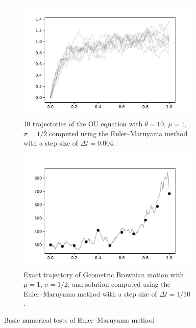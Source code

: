 \documentclass[12pt]{article}
\begin{document}
\begin{figure}[ht!]\centering
\begin{subfigure}{.48\textwidth}\centering
    \includegraphics[width=\textwidth]{img/OU_em_10.pdf}
    \caption{10 trajectories of the OU equation with \( \theta = 10 \), \( \mu = 1 \), \( \sigma = 1/2 \) computed using the Euler--Maruyama method with a step size of \( \Delta t = 0.004 \).}
    \label{OU_em}
\end{subfigure}\hfill
\begin{subfigure}{.48\textwidth}\centering
    \includegraphics[width=\textwidth]{img/GBM_true_vs_10.pdf}
    \caption{Exact trajectory of Geometric Brownian motion with \( \mu = 1 \), \( \sigma = 1/2 \), and solution computed using the Euler--Maruyama method with a step size of \( \Delta t = 1/10 \).}
    \label{GBM_em}
\end{subfigure}
\caption{Basic numerical tests of Euler--Maruyama method}
\label{EM_tests}
\end{figure}
\end{document}
